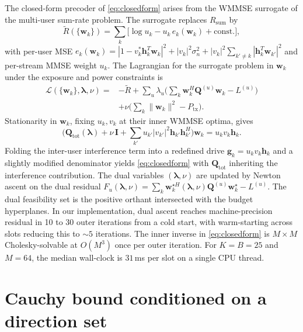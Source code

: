 \documentclass[journal,twocolumn,10pt]{IEEEtran}
\theoremstyle{plain}
\theoremstyle{remark}
\newcommand{\hh}{\mathbf{h}}
\newcommand{\ww}{\mathbf{w}}
\newcommand{\gvec}{\mathbf{g}}
\newcommand{\Qmat}{\mathbf{Q}}
\begin{document}
The closed-form precoder of \cref{eq:closedform} arises from the
WMMSE surrogate of the multi-user sum-rate problem. The surrogate
replaces $R_{\mathrm{sum}}$ by
\begin{equation}\label{eq:WMMSE-obj}
  \tilde R(\{\ww_k\}) = \sum_k\bigl[\log u_k - u_k\,e_k(\ww_k)
  + \mathrm{const.}\bigr],
\end{equation}
with per-user MSE
$e_k(\ww_k) = |1 - v_k^* \hh_k^T \ww_k|^2 + |v_k|^2 \sigma_n^2 +
|v_k|^2 \sum_{k' \neq k} |\hh_k^T \ww_{k'}|^2$ and per-stream MMSE
weight $u_k$. The Lagrangian for the surrogate problem in $\ww_k$
under the exposure and power constraints is
\begin{equation}\label{eq:lagrangian}
\begin{aligned}
\mathcal{L}(\{\ww_k\}, \bm\lambda, \nu)
={}& -\tilde R + \sum_u \lambda_u
  \biggl(\sum_k \ww_k^H \Qmat^{(u)} \ww_k - L^{(u)}\biggr) \\
& + \nu\biggl(\sum_k \|\ww_k\|^2 - P_{\mathrm{tx}}\biggr).
\end{aligned}
\end{equation}
Stationarity in $\ww_k$, fixing $u_k, v_k$ at their inner WMMSE
optima, gives
\begin{equation}\label{eq:KKT}
  \biggl(\Qmat_{\mathrm{tot}}(\bm\lambda) + \nu\,\mathbf{I} +
  \sum_{k'} u_{k'} |v_{k'}|^2 \hh_{k'}\hh_{k'}^H\biggr) \ww_k =
  u_k v_k \hh_k.
\end{equation}
Folding the inter-user interference term into a redefined drive
$\gvec_k = u_k v_k \hh_k$ and a slightly modified denominator yields
\cref{eq:closedform} with $\Qmat_{\mathrm{tot}}$ inheriting the
interference contribution. The dual variables $(\bm\lambda, \nu)$
are updated by Newton ascent on the dual residual
$F_u(\bm\lambda, \nu) = \sum_k \ww_k^{\star H}(\bm\lambda, \nu)
\Qmat^{(u)} \ww_k^\star - L^{(u)}$. The dual feasibility set is the
positive orthant intersected with the budget hyperplanes. In our
implementation, dual ascent reaches machine-precision residual in
10 to 30 outer iterations from a cold start, with warm-starting
across slots reducing this to $\sim 5$ iterations. The inner inverse
in \cref{eq:closedform} is $M \times M$ Cholesky-solvable at
$O(M^3)$ once per outer iteration. For $K = B = 25$ and $M = 64$,
the median wall-clock is $31\,$ms per slot on a single CPU thread.


\section{Cauchy bound conditioned on a direction set}\label{app:cauchy}
\end{document}
